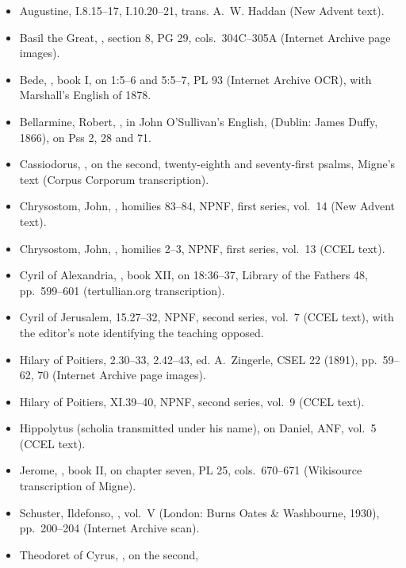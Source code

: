 {\begin{itemize}[leftmargin=1.2em,itemsep=.25em]
sections 19--20, trans. J.~R. King, NPNF, first series, vol.~4 (New Advent
text).
\item Augustine,  I.8.15--17, I.10.20--21, trans.
A.~W. Haddan (New Advent text).
\item Basil the Great, , section 8, PG 29,
cols.~304C--305A (Internet Archive page images).
\item Bede, , book I, on 1:5--6 and 5:5--7, PL 93
(Internet Archive OCR), with Marshall's English of 1878.
\item Bellarmine, Robert, , in John O'Sullivan's
English,  (Dublin: James Duffy, 1866),
on Pss 2, 28 and 71.
\item Cassiodorus, , on the second, twenty-eighth and
seventy-first psalms, Migne's text (Corpus Corporum transcription).
\item Chrysostom, John, , homilies 83--84, NPNF,
first series, vol.~14 (New Advent text).
\item Chrysostom, John, , homilies 2--3, NPNF,
first series, vol.~13 (CCEL text).
\item Cyril of Alexandria, , book XII, on 18:36--37,
Library of the Fathers 48, pp.~599--601 (tertullian.org transcription).
\item Cyril of Jerusalem,  15.27--32, NPNF, second
series, vol.~7 (CCEL text), with the editor's note identifying the teaching
opposed.
\item Hilary of Poitiers,  2.30--33, 2.42--43,
ed. A.~Zingerle, CSEL 22 (1891), pp.~59--62, 70 (Internet Archive page images).
\item Hilary of Poitiers,  XI.39--40, NPNF, second series,
vol.~9 (CCEL text).
\item Hippolytus (scholia transmitted under his name), on Daniel, ANF, vol.~5
(CCEL text).
\item Jerome, , book II, on chapter seven, PL 25,
cols.~670--671 (Wikisource transcription of Migne).
\item Schuster, Ildefonso, ,
vol.~V (London: Burns Oates \& Washbourne, 1930), pp.~200--204 (Internet
Archive scan).
\item Theodoret of Cyrus, , on the second,

\end{itemize}}
